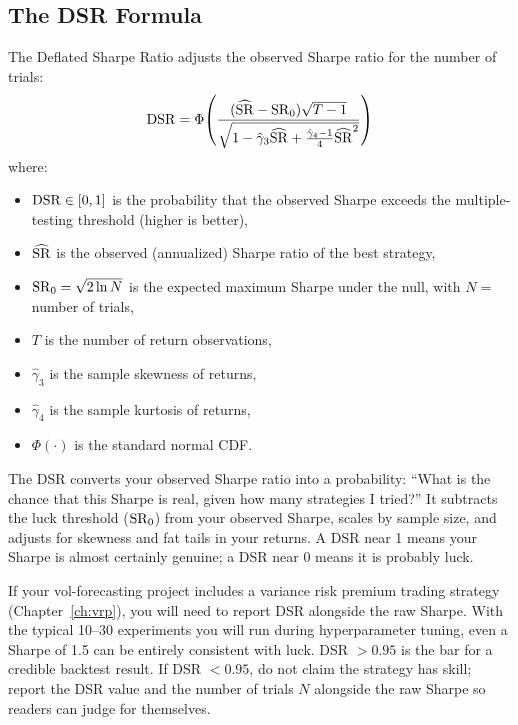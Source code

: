 \subsection{The DSR Formula}

The Deflated Sharpe Ratio adjusts the observed Sharpe ratio for the number of trials:
\begin{equation}
\label{eq:dsr}
\operatorname{DSR} = \Phi\!\left(\frac{(\widehat{\operatorname{SR}} - \operatorname{SR}_0)\sqrt{T-1}}{\sqrt{1 - \hat{\gamma}_3 \widehat{\operatorname{SR}} + \frac{\hat{\gamma}_4 - 1}{4}\widehat{\operatorname{SR}}^2}}\right)
\end{equation}
where:
\begin{itemize}[nosep]
  \item $\operatorname{DSR} \in [0, 1]$ is the probability that the observed Sharpe exceeds the multiple-testing threshold (higher is better),
  \item $\widehat{\operatorname{SR}}$ is the observed (annualized) Sharpe ratio of the best strategy,
  \item $\operatorname{SR}_0 = \sqrt{2 \ln N}$ is the expected maximum Sharpe under the null, with $N =$ number of trials,
  \item $T$ is the number of return observations,
  \item $\hat{\gamma}_3$ is the sample skewness of returns,
  \item $\hat{\gamma}_4$ is the sample kurtosis of returns,
  \item $\Phi(\cdot)$ is the standard normal CDF.
\end{itemize}

\begin{intuition}
The DSR converts your observed Sharpe ratio into a probability: ``What is the chance that this Sharpe is real, given how many strategies I tried?''
It subtracts the luck threshold ($\operatorname{SR}_0$) from your observed Sharpe, scales by sample size, and adjusts for skewness and fat tails in your returns.
A DSR near 1 means your Sharpe is almost certainly genuine; a DSR near 0 means it is probably luck.
\end{intuition}

\begin{projectconnection}
If your vol-forecasting project includes a variance risk premium trading strategy (Chapter~\ref{ch:vrp}), you will need to report DSR alongside the raw Sharpe.
With the typical 10--30 experiments you will run during hyperparameter tuning, even a Sharpe of 1.5 can be entirely consistent with luck.
DSR $> 0.95$ is the bar for a credible backtest result.
If DSR $< 0.95$, do not claim the strategy has skill; report the DSR value and the number of trials $N$ alongside the raw Sharpe so readers can judge for themselves.
\end{projectconnection}

